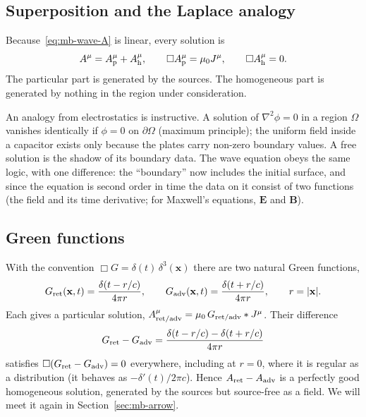 \subsection{Superposition and the Laplace analogy}

Because~\eqref{eq:mb-wave-A} is linear, every solution is
\begin{equation}
A^\mu=A^\mu_{\rm p}+A^\mu_{\rm h},\qquad
\Box A^\mu_{\rm p}=\mu_0J^\mu,\qquad \Box A^\mu_{\rm h}=0 .
\label{eq:mb-split}
\end{equation}
The particular part is generated by the sources. The homogeneous part is
generated by nothing in the region under consideration.

An analogy from electrostatics is instructive. A solution of
$\nabla^2\phi=0$ in a region $\Omega$ vanishes identically if $\phi=0$ on
$\partial\Omega$ (maximum principle); the uniform field inside a capacitor
exists only because the plates carry non-zero boundary values. A free
solution is the shadow of its boundary data. The wave equation obeys the
same logic, with one difference: the ``boundary'' now includes the initial
surface, and since the equation is second order in time the data on it
consist of two functions (the field and its time derivative; for Maxwell's
equations, $\mathbf E$ and $\mathbf B$).

\subsection{Green functions}

With the convention $\Box G=\delta(t)\,\delta^3(\mathbf x)$ there are two
natural Green functions,
\begin{equation}
G_{\rm ret}(\mathbf x,t)=\frac{\delta(t-r/c)}{4\pi r},\qquad
G_{\rm adv}(\mathbf x,t)=\frac{\delta(t+r/c)}{4\pi r},
\qquad r=|\mathbf x| .
\label{eq:mb-green}
\end{equation}
Each gives a particular solution, $A^\mu_{\rm ret/adv}=\mu_0\,G_{\rm ret/adv}*J^\mu$.
Their difference
\begin{equation}
G_{\rm ret}-G_{\rm adv}=\frac{\delta(t-r/c)-\delta(t+r/c)}{4\pi r}
\label{eq:mb-pauli-jordan}
\end{equation}
satisfies $\Box(G_{\rm ret}-G_{\rm adv})=0$ everywhere, including at $r=0$,
where it is regular as a distribution (it behaves as $-\delta'(t)/2\pi c$).
Hence $A_{\rm ret}-A_{\rm adv}$ is a perfectly good homogeneous solution,
generated by the sources but source-free as a field. We will meet it again
in Section~\ref{sec:mb-arrow}.

